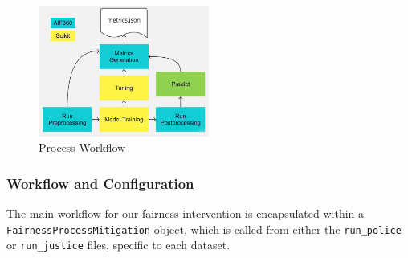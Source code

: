 \documentclass[runningheads]{llncs}
\begin{document}
\begin{figure}
    \centering \includegraphics[width=0.5\textwidth]{../tex/Flowchart}
    \caption{Process Workflow}
    \label{fig:methodology-workflow}
\end{figure}




\subsubsection{Workflow and Configuration}

The main workflow for our fairness intervention is encapsulated within
a \texttt{FairnessProcessMitigation} object, which is called from
either the \texttt{run\_police} or \texttt{run\_justice} files,
specific to each dataset.
\end{document}

